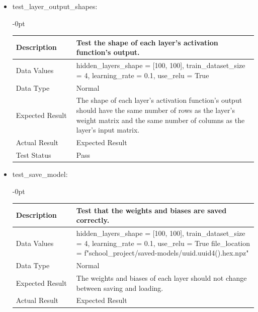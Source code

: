 \documentclass[./project-report/src/latex/project-report.tex]{subfiles}
\begin{document}
\begin{itemize}
\begin{itemize}
\begin{itemize}
					\vspace{5mm}

					\item test\_layer\_output\_shapes: \newline
					\begin{adjustwidth}{-\leftmargin}{0pt}
					\begin{tabular}{|p{0.25\linewidth}|p{0.75\linewidth}|}
						\hline
						Description & Test the shape of each layer's activation function's output. \\
						\hline
						Data Values & hidden\_layers\_shape = [100, 100], \newline
                         	train\_dataset\_size = 4, \newline
                         	learning\_rate = 0.1, \newline
                         	use\_relu = True \\
						\hline
						Data Type & Normal \\
						\hline
						Expected Result & The shape of each layer's activation function's output should have the same number of rows as the layer's weight matrix and the same number of columns as the layer's input matrix. \\
						\hline
						Actual Result & Expected Result \\
						\hline
						Test Status & Pass \\
						\hline
					\end{tabular}
					\end{adjustwidth}

					\vspace{5mm}

					\item test\_save\_model: \newline
					\begin{adjustwidth}{-\leftmargin}{0pt}
					\begin{tabular}{|p{0.25\linewidth}|p{0.75\linewidth}|}
						\hline
						Description & Test that the weights and biases are saved correctly. \\
						\hline
						Data Values & hidden\_layers\_shape = [100, 100], \newline
                            train\_dataset\_size = 4, \newline
                            learning\_rate = 0.1, \newline
                            use\_relu = True
							file\_location = f"school\_project/saved-models/{uuid.uuid4().hex}.npz" \\
						\hline
						Data Type & Normal \\
						\hline
						Expected Result & The weights and biases of each layer should not change between saving and loading. \\
						\hline
						Actual Result & Expected Result \\
						\hline
					\end{tabular}
					\end{adjustwidth}


\end{itemize}
\end{itemize}
\end{itemize}
\end{document}
